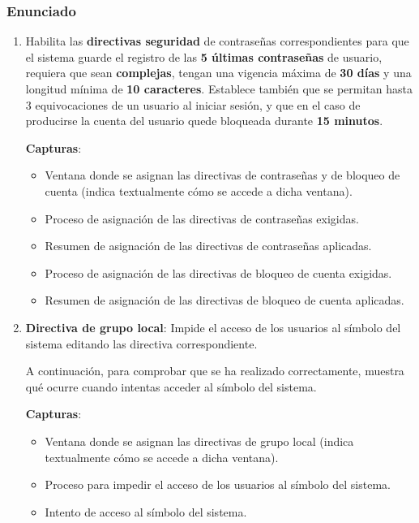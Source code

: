 \subsubsection{Enunciado}
\begin{enumerate}[label=\alph*)]
    \item Habilita las \textbf{directivas seguridad} de contraseñas correspondientes para que el sistema guarde el registro de las \textbf{5 últimas contraseñas} de usuario, requiera que sean \textbf{complejas}, tengan una vigencia máxima de \textbf{30 días} y una longitud mínima de \textbf{10 caracteres}. Establece también que se permitan hasta 3 equivocaciones de un usuario al iniciar sesión, y que en el caso de producirse la cuenta del usuario quede bloqueada durante \textbf{15 minutos}.

    \textbf{Capturas}:
    \begin{itemize}
        \item Ventana donde se asignan las directivas de contraseñas y de bloqueo de cuenta (indica textualmente cómo se accede a dicha ventana).
        \item Proceso de asignación de las directivas de contraseñas exigidas.
        \item Resumen de asignación de las directivas de contraseñas aplicadas.
        \item Proceso de asignación de las directivas de bloqueo de cuenta exigidas.
        \item Resumen de asignación de las directivas de bloqueo de cuenta aplicadas.
    \end{itemize}

    \item \textbf{Directiva de grupo local}: Impide el acceso de los usuarios al símbolo del sistema editando las directiva correspondiente.

    A continuación, para comprobar que se ha realizado correctamente, muestra qué ocurre cuando intentas acceder al símbolo del sistema.

    \textbf{Capturas}:
        \begin{itemize}
            \item Ventana donde se asignan las directivas de grupo local (indica textualmente cómo se accede a dicha ventana).
            \item Proceso para impedir el acceso de los usuarios al símbolo del sistema.
            \item Intento de acceso al símbolo del sistema.
        \end{itemize}
\end{enumerate}

